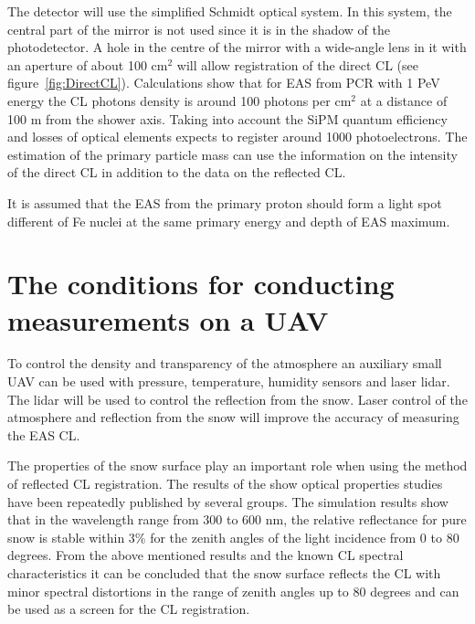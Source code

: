 \documentclass[a4paper,11pt]{article}
\begin{document}
The detector will use the simplified Schmidt optical system. In this system, the central part of the mirror is not used since it is in the shadow of the photodetector. A hole in the centre of the mirror with a wide-angle lens in it with an aperture of about 100 cm$^2$ will allow registration of the direct CL (see figure~\ref{fig:DirectCL}). Calculations show that for EAS from PCR with 1 PeV energy the CL photons density is around 100 photons per cm$^2$ at a distance of 100 m from the shower axis. Taking into account the SiPM quantum efficiency and losses of optical elements expects to register around 1000 photoelectrons. The estimation of the primary particle mass can use the information on the intensity of the direct CL in addition to the data on the reflected CL.

It is assumed that the EAS from the primary proton should form a light spot different of Fe nuclei at the same primary energy and depth of EAS maximum.


\section{The conditions for conducting measurements on a UAV}

To control the density and transparency of the atmosphere an auxiliary small UAV can be used with pressure, temperature, humidity sensors and laser lidar. The lidar will be used to control the reflection from the snow. Laser control of the atmosphere and reflection from the snow will improve the accuracy of measuring the EAS CL.

The properties of the snow surface play an important role when using the method of reflected CL registration. The results of the show optical properties studies have been repeatedly published by several groups. The simulation results show that in the wavelength range from 300 to 600 nm, the relative reflectance for pure snow is stable within 3\% for the zenith angles of the light incidence from 0 to 80 degrees. From the above mentioned results and the known CL spectral characteristics it can be concluded that the snow surface reflects the CL with minor spectral distortions in the range of zenith angles up to 80 degrees and can be used as a screen for the CL registration.




\end{document}
